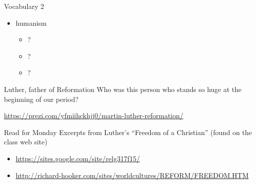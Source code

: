\begin{frame}[label=sec-2-2]{Vocabulary 2}
\begin{itemize}
\item humanism
\begin{itemize}
\item ?
\item ?
\item ?
\end{itemize}
\end{itemize}
\end{frame}
\begin{frame}[label=sec-2-3]{Luther, father of Reformation}
Who was this person who stands so huge at the beginning of our period?

\url{https://prezi.com/yfmiihckhjj0/martin-luther-reformation/}
\end{frame}
\begin{frame}[label=sec-2-4]{Read for Monday}
Excerpts from Luther's ``Freedom of a Christian'' (found on the class web site)
\begin{itemize}
\item \url{https://sites.google.com/site/relg317f15/}

\item \url{http://richard-hooker.com/sites/worldcultures/REFORM/FREEDOM.HTM}
\end{itemize}
\end{frame}

